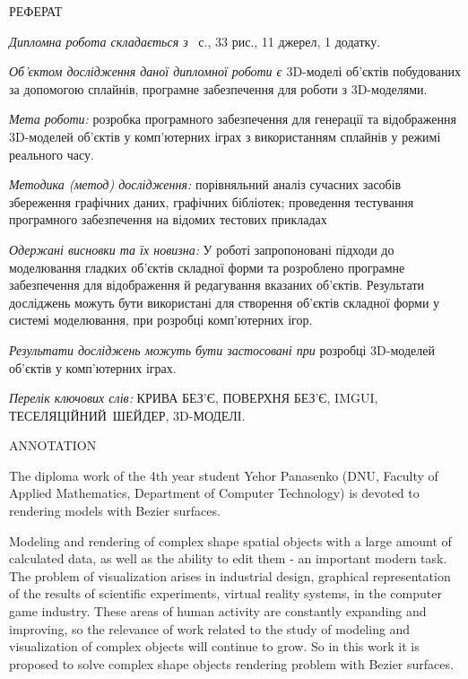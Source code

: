 \let\mypdfximage\pdfximage\def\pdfximage{\immediate\mypdfximage}\documentclass[14pt,a4paper]{extarticle}
\title{}
\author{}
\date{}
\theoremstyle{definition}
\renewcommand{\[}{\begin{singlespace}\begin{equation*}}
\renewcommand{\]}{\end{equation*}\end{singlespace}}
\renewcommand{\+}{\discretionary{\mbox{\scriptsize$\hookleftarrow$}}{}{}}
\begin{document}
\captionsetup[figure]{format=plain,labelsep=endash,labelfont=normalfont,textfont=normalfont}
\sloppy %
\allowdisplaybreaks %



\thispagestyle{empty}
\begin{center}
РЕФЕРАТ
\end{center}


\textit{Дипломна робота складається з}~\pageref{lastpage} с., 33 рис., 11 джерел, 1 додатку.

\textit{Об'єктом дослідження даної дипломної роботи є} 3D-моделі об'єктів побудованих за допомогою сплайнів, програмне забезпечення для роботи з 3D-моделями.

\textit{Мета роботи:} розробка програмного забезпечення для генерації та відображення 3D-моделей об'єктів у комп'ютерних іграх з використанням сплайнів у режимі реального часу.

\textit{Методика (метод) дослідження:} порівняльний аналіз сучасних засобів збереження графічних даних, графічних бібліотек; проведення тестування програмного забезпечення на відомих тестових прикладах

\textit{Одержані висновки та їх новизна:} У роботі запропоновані підходи до моделювання гладких об'єктів складної форми та розроблено програмне забезпечення для відображення й редагування вказаних об'єктів. Результати досліджень можуть бути використані для створення об'єктів складної форми у системі моделювання, при розробці комп'ютерних ігор.

\textit{Результати досліджень можуть бути застосовані при} розробці 3D-моделей об'єктів у комп'ютерних іграх.

\textit{Перелік ключових слів:} КРИВА БЕЗ'Є, ПОВЕРХНЯ БЕЗ'Є, IMGUI, ТЕСЕЛЯЦІЙНИЙ ШЕЙДЕР, 3D-МОДЕЛІ.

\newpage

\begin{center}
ANNOTATION
\end{center}

The diploma work of the 4th year student Yehor Panasenko (DNU, Faculty of Applied Mathematics, Department of Computer Technology) is devoted to rendering models with Bezier surfaces.

Modeling and rendering of complex shape spatial objects with a large amount of calculated data, as well as the ability to edit them - an important modern task. The problem of visualization arises in industrial design, graphical representation of the results of scientific experiments, virtual reality systems, in the computer game industry. These areas of human activity are constantly expanding and improving, so the relevance of work related to the study of modeling and visualization of complex objects will continue to grow. So in this work it is proposed to solve complex shape objects rendering problem with Bezier surfaces.
\end{document}
